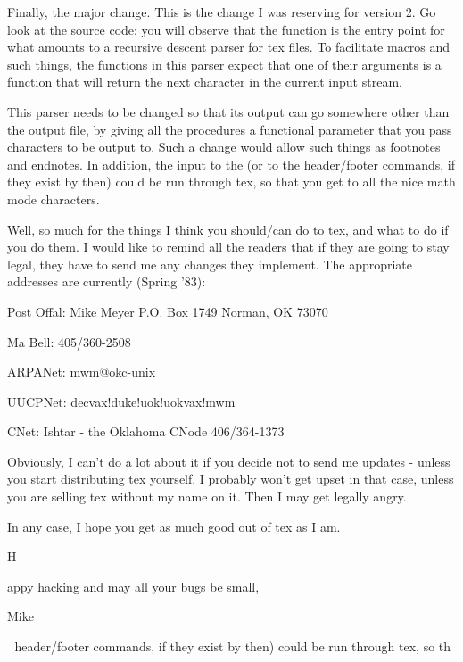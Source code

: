 Finally, the major change. This is the change I was reserving for
version 2. Go look at the source code: you will observe that
the  function is the entry point for what amounts
to a recursive descent parser for tex files. To facilitate macros
and such things, the functions in this parser expect that one of
their arguments is a function that will return the next character
in the current input stream.

This parser needs to be changed so that its output can go
somewhere other than the output file, by giving all the
procedures a functional parameter that you pass characters to be
output to. Such a change would allow such things as footnotes and
endnotes. In addition, the input to the  (or to the
header/footer commands, if they exist by then) could be run
through tex, so that you get to all the nice math mode characters.


Well, so much for the things I think you should/can do to tex,
and what to do if you do them. I would like to remind all the
readers that if they are going to stay legal, they have to send
me any changes they implement. The appropriate addresses are
currently (Spring '83):
{\verbatim

Post Offal: Mike Meyer
P.O. Box 1749
Norman, OK 73070

Ma Bell: 405/360-2508

ARPANet: mwm@okc-unix

UUCPNet: decvax!duke!uok!uokvax!mwm

CNet: Ishtar - the Oklahoma CNode 406/364-1373
}

Obviously, I can't do a lot about it if you decide not to send me
updates - unless you start distributing tex yourself. I probably
won't get upset in that case, unless you are selling tex without my
name on it. Then I may get legally angry.

In any case, I hope you get as much good out of tex as I am.

{\closing
Happy hacking and may all your bugs be small,

Mike}
header/footer commands, if they exist by then) could be run
through tex, so th